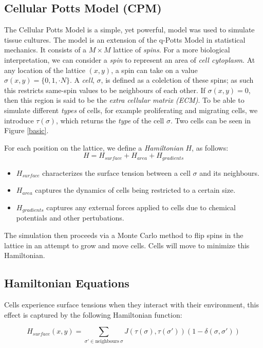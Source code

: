 \documentclass[12pt]{article}
\begin{document}
\subsection{Cellular Potts Model (CPM)}
The Cellular Potts Model \cite{Graner1992} is a simple, yet powerful, model was used to simulate tissue cultures.  The model is an extension of the q-Potts Model in statistical mechanics. It consists of a $M\times M$ lattice of \emph{spins}. For a more biological interpretation, we can consider a \emph{spin} to represent an area of \emph{cell cytoplasm}. At any location of the lattice $(x,y)$, a spin can take on a value $\sigma(x,y) = \{0,1,\cdot N\}$. A \emph{cell}, $\sigma$, is defined as a colelction of these spins; as such this restricts same-spin values to be neighbours of each other. If $\sigma(x,y) = 0$, then this region is said to be the \emph{extra cellular matrix (ECM)}. To be able to simulate different \emph{types} of cells, for example proliferating and migrating cells, we introduce $\tau(\sigma)$, which returns the \emph{type} of the cell $\sigma$. Two cells can be seen in Figure \ref{basic}.

For each position on the lattice, we define a \emph{Hamiltonian} $H$, as follows:
\[
	H = H_{surface} + H_{area} + H_{gradients}
\]
\begin{itemize}
	\item $H_{surface}$ characterizes the surface tension between a cell $\sigma$ and its neighbours.
	\item $H_{area}$ captures the dynamics of cells being restricted to a certain size.
	\item $H_{gradients}$ captures any external forces applied to cells due to chemical potentials and other pertubations.
\end{itemize}

The simulation then proceeds via a Monte Carlo method to flip spins in the lattice in an attempt to grow and move cells. Cells will move to minimize this Hamiltonian.

\subsection{Hamiltonian Equations}
Cells experience surface tensions when they interact with their environment, this effect is captured by the following Hamiltonian function:

\begin{equation}
	H_{surface} (x,y) = \sum_{\sigma' \in \text{neighbours}~\sigma} J(\tau(\sigma), \tau(\sigma'))(1-\delta(\sigma, \sigma'))
\end{equation}
\end{document}
